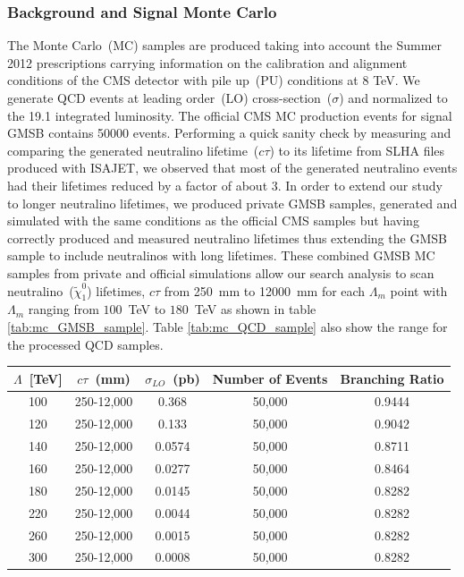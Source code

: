 \subsubsection*{Background and Signal Monte Carlo}
The Monte Carlo~(MC) samples are produced taking into account the Summer 2012 prescriptions carrying information on the calibration and alignment conditions of the CMS detector with pile up~(PU) conditions at 8 TeV.
We generate QCD events at leading order~(LO) cross-section~($\sigma$) and normalized to the 19.1 \fbinv integrated luminosity. The official CMS MC production events for signal GMSB contains 50000 events. Performing a quick sanity check by measuring and comparing the generated neutralino lifetime~($c\tau$) to its lifetime from SLHA files produced with ISAJET, we observed that most of the generated neutralino events had their lifetimes reduced by a factor of about 3. In order to extend our study to longer neutralino lifetimes, we produced private GMSB samples, generated and simulated with the same conditions as the official CMS samples but having correctly produced and measured neutralino lifetimes thus extending the GMSB sample to include neutralinos with long lifetimes.
  These combined GMSB MC samples from private and official simulations allow our search analysis to scan neutralino~($\tilde{\chi}^{0}_{1}$) lifetimes, $c\tau$ from 250~mm to 12000~mm for each $\Lambda_{m}$ point with $\Lambda_{m}$ ranging from $100$~TeV to $180$~TeV as shown in table \ref{tab:mc_GMSB_sample}. Table \ref{tab:mc_QCD_sample} also show the \pt range for the processed QCD samples.

\begin{center}
\centering
\begin{tabular}{c c c c c}
       \toprule
        \hline
        $\Lambda$~[TeV] & $c\tau$~(mm) & $\sigma_{LO}$~(pb) & \bfseries{Number of Events} & \bfseries{Branching Ratio}\\
       \hline
       100 & 250-12,000  & 0.368  & 50,000 & 0.9444\\
       120 & 250-12,000  & 0.133  & 50,000 & 0.9042\\
       140 & 250-12,000  & 0.0574 & 50,000 & 0.8711\\
       160 & 250-12,000  & 0.0277 & 50,000 & 0.8464\\
       180 & 250-12,000  & 0.0145 & 50,000 & 0.8282\\
       220 & 250-12,000  & 0.0044 & 50,000 & 0.8282\\
       260 & 250-12,000  & 0.0015 & 50,000 & 0.8282\\
       300 & 250-12,000  & 0.0008 & 50,000 & 0.8282\\
       \hline
       \bottomrule
       \end{tabular}  
\label{tab:mc_GMSB_sample}
\end{center}


